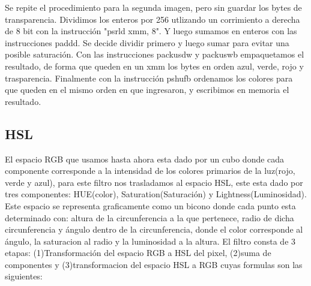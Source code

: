 \documentclass[a4paper]{article}
\begin{document}
Se repite el procedimiento para la segunda imagen, pero sin guardar los bytes de transparencia. Dividimos los enteros por 256 utlizando un corrimiento a derecha de 8 bit con la instrucción "psrld xmm, 8". Y luego sumamos en enteros con las instrucciones paddd. Se decide dividir primero y luego sumar para evitar una posible saturación. Con las instrucciones packusdw y packuswb empaquetamos el resultado, de forma que queden en un xmm los bytes en orden azul, verde, rojo y trasparencia. Finalmente con la instrucción pshufb ordenamos los colores para que queden en el mismo orden en que ingresaron, y escribimos en memoria el resultado.

\newpage

\subsection{HSL}
El espacio RGB que usamos hasta ahora esta dado por un cubo donde cada componente corresponde a la intensidad de los colores primarios de la luz(rojo, verde y azul), para este filtro nos trasladamos al espacio HSL, este esta dado por tres componentes: HUE(color), Saturation(Saturación) y Lightness(Luminosidad). Este espacio se representa graficamente como un bicono donde cada punto esta determinado con: altura de la circunferencia a la que pertenece, radio de dicha circunferencia y ángulo dentro de la circunferencia, donde el color corresponde al ángulo, la saturacion al radio y la luminosidad a la altura.
El filtro consta de 3 etapas: (1)Transformación del espacio RGB a HSL del pixel, (2)suma de componentes y (3)transformacion del espacio HSL a RGB cuyas formulas son las siguientes:
\newline
\end{document}
